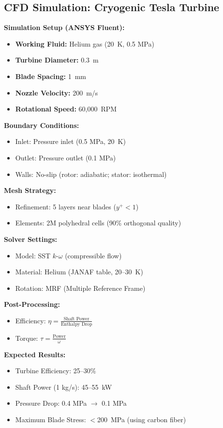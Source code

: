 \documentclass[12pt]{article}
\begin{document}
\subsection{CFD Simulation: Cryogenic Tesla Turbine}
\textbf{Simulation Setup (ANSYS Fluent):}
\begin{itemize}
    \item \textbf{Working Fluid:} Helium gas (20~K, 0.5 MPa)
    \item \textbf{Turbine Diameter:} 0.3~m
    \item \textbf{Blade Spacing:} 1~mm
    \item \textbf{Nozzle Velocity:} 200~m/s
    \item \textbf{Rotational Speed:} 60,000~RPM
\end{itemize}

\textbf{Boundary Conditions:}
\begin{itemize}
    \item Inlet: Pressure inlet (0.5 MPa, 20~K)
    \item Outlet: Pressure outlet (0.1 MPa)
    \item Walls: No-slip (rotor: adiabatic; stator: isothermal)
\end{itemize}

\textbf{Mesh Strategy:}
\begin{itemize}
    \item Refinement: 5 layers near blades ($y^+ < 1$)
    \item Elements: 2M polyhedral cells (90\% orthogonal quality)
\end{itemize}

\textbf{Solver Settings:}
\begin{itemize}
    \item Model: SST $k$-$\omega$ (compressible flow)
    \item Material: Helium (JANAF table, 20--30~K)
    \item Rotation: MRF (Multiple Reference Frame)
\end{itemize}

\textbf{Post-Processing:}
\begin{itemize}
    \item Efficiency: $\eta = \frac{\text{Shaft Power}}{\text{Enthalpy Drop}}$
    \item Torque: $\tau = \frac{\text{Power}}{\omega}$
\end{itemize}

\textbf{Expected Results:}
\begin{itemize}
    \item Turbine Efficiency: 25--30\%
    \item Shaft Power (1 kg/s): 45--55~kW
    \item Pressure Drop: 0.4 MPa $\rightarrow$ 0.1 MPa
    \item Maximum Blade Stress: $<$200~MPa (using carbon fiber)
\end{itemize}
\end{document}
